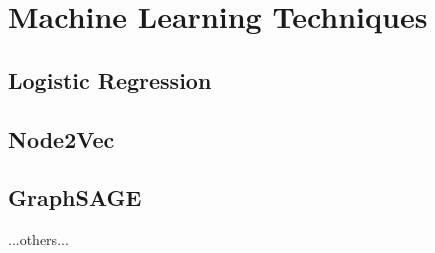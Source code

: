 \section{ Machine Learning Techniques}
\subsection{Logistic Regression}\label{sec:logistic_regression}
\subsection{Node2Vec}
\subsection{GraphSAGE}

...others...